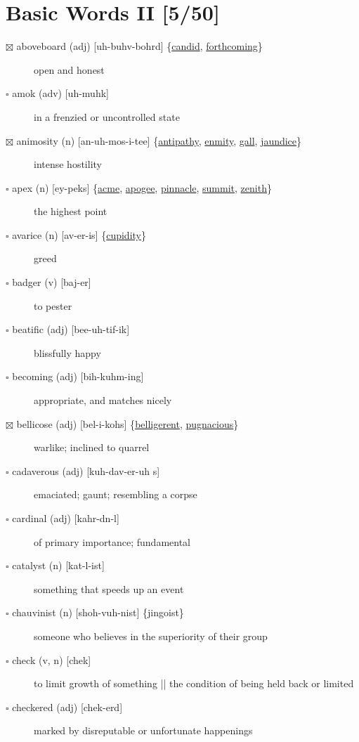 \documentclass[11pt]{article}
\begin{document}
\section{Basic Words II [5/50]}
\label{sec:orge6f240a}
\begin{description}
\item[{$\boxtimes$ \label{org5b88c40}aboveboard (adj) [uh-buhv-bohrd] \{\hyperref[org28fa9d1]{candid}, \hyperref[org2cb80f0]{forthcoming}\}}] open and honest
\item[{$\square$ amok (adv) [uh-muhk]}] in a frenzied or uncontrolled state
\item[{$\boxtimes$ \label{orgcd922a6}animosity (n) [an-uh-mos-i-tee] \{\hyperref[org53f5dc2]{antipathy}, \hyperref[org22b3817]{enmity}, \hyperref[orge1299c1]{gall}, \hyperref[orgfb883d9]{jaundice}\}}] intense hostility
\item[{$\square$ \label{org6b46e9e}apex (n) [ey-peks] \{\hyperref[orgcd04c21]{acme}, \hyperref[orge7e78f1]{apogee}, \hyperref[orgc8167b5]{pinnacle}, \hyperref[org9cb55e7]{summit}, \hyperref[org79910cc]{zenith}\}}] the highest point
\item[{$\square$ \label{org13c6f4e}avarice (n) [av-er-is] \{\hyperref[org0c34aaa]{cupidity}\}}] greed
\item[{$\square$ badger (v) [baj-er]}] to pester
\item[{$\square$ beatific (adj) [bee-uh-tif-ik]}] blissfully happy
\item[{$\square$ becoming (adj) [bih-kuhm-ing]}] appropriate, and matches nicely
\item[{$\boxtimes$ \label{orge39b955}bellicose (adj) [bel-i-kohs] \{\hyperref[org16afac9]{belligerent}, \hyperref[org20a75ac]{pugnacious}\}}] warlike; inclined to quarrel
\item[{$\square$ cadaverous (adj) [kuh-dav-er-uh s]}] emaciated; gaunt; resembling a corpse
\item[{$\square$ cardinal (adj) [kahr-dn-l]}] of primary importance; fundamental
\item[{$\square$ \label{org49b5c45} catalyst (n) [kat-l-ist]}] something that speeds up an event
\item[{$\square$ \label{orga448555}chauvinist (n) [shoh-vuh-nist] \{jingoist\}}] someone who believes in the superiority of their group
\item[{$\square$ check (v, n) [chek]}] to limit growth of something || the condition of being held back or limited
\item[{$\square$ checkered (adj) [chek-erd]}] marked by disreputable or unfortunate happenings

\end{description}
\end{document}
